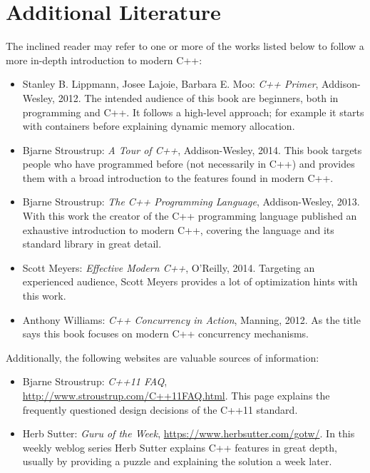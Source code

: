 \section{Additional Literature}

The inclined reader may refer to one or more of the works listed below to follow a more in-depth introduction to modern C++:

\begin{itemize}
\item Stanley B. Lippmann, Josee Lajoie, Barbara E. Moo: \textit{C++ Primer}, Addison-Wesley, 2012. The intended audience of this book are beginners, both in programming and C++. It follows a high-level approach; for example it starts with containers before explaining dynamic memory allocation.
\item Bjarne Stroustrup: \textit{A Tour of C++}, Addison-Wesley, 2014. This book targets people who have programmed before (not necessarily in C++) and provides them with a broad introduction to the features found in modern C++.
\item Bjarne Stroustrup: \textit{The C++ Programming Language}, Addison-Wesley, 2013. With this work the creator of the C++ programming language published an exhaustive introduction to modern C++, covering the language and its standard library in great detail.
\item Scott Meyers: \textit{Effective Modern C++}, O'Reilly, 2014. Targeting an experienced audience, Scott Meyers provides a lot of optimization hints with this work.
\item Anthony Williams: \textit{C++ Concurrency in Action}, Manning, 2012. As the title says this book focuses on modern C++ concurrency mechanisms.
\end{itemize}

Additionally, the following websites are valuable sources of information:

\begin{itemize}
\item Bjarne Stroustrup: \textit{C++11 FAQ}, \url{http://www.stroustrup.com/C++11FAQ.html}. This page explains the frequently questioned design decisions of the C++11 standard.
\item Herb Sutter: \textit{Guru of the Week}, \url{https://www.herbsutter.com/gotw/}. In this weekly weblog series Herb Sutter explains C++ features in great depth, usually by providing a puzzle and explaining the solution a week later.
\end{itemize}